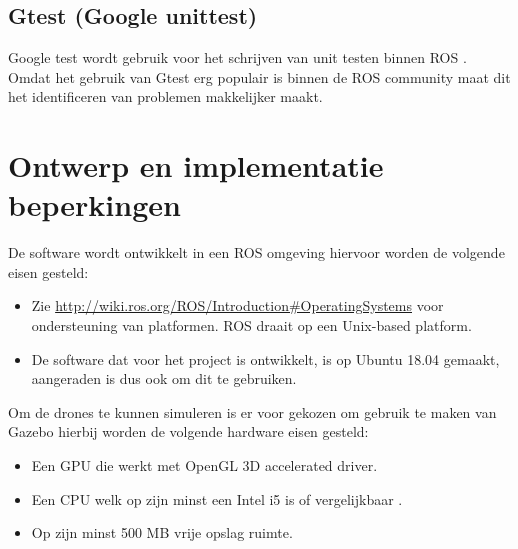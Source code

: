 \documentclass[a4paper, 11pt, oneside]{report}
\begin{document}
\subsection{Gtest (Google unittest)}
\label{inleiding:werkomgeving:gtest}

Google test wordt gebruik voor het schrijven van unit testen binnen ROS \cite{googletest}. Omdat het gebruik van Gtest erg populair is binnen de ROS community maat dit het identificeren van problemen makkelijker maakt. 




\section{Ontwerp en implementatie beperkingen}
\label{inleiding:ontwerpberkingen}

De software wordt ontwikkelt in een ROS omgeving hiervoor worden de volgende eisen gesteld:
\begin{itemize}
	\item  Zie \href{http://wiki.ros.org/ROS/Introduction\#Operating\_Systems}{http://wiki.ros.org/ROS/Introduction\#Operating\textunderscore Systems} voor ondersteuning van platformen. ROS draait op een Unix-based platform.
	\item De software dat voor het project is ontwikkelt, is op Ubuntu 18.04 gemaakt, aangeraden is dus ook om dit te gebruiken.
\end{itemize}

Om de drones te kunnen simuleren is er voor gekozen om gebruik te maken van Gazebo hierbij worden de volgende hardware eisen gesteld:

\begin{itemize}
	\item Een GPU die werkt met OpenGL 3D accelerated driver.
	\item Een CPU welk op zijn minst een Intel i5 is of vergelijkbaar \cite{gazeborequirements}. 
	\item Op zijn minst 500 MB vrije opslag ruimte.
\end{itemize}
\end{document}

